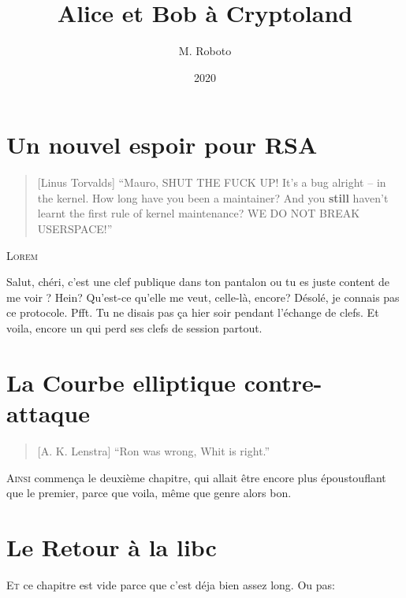 \documentclass[a4paper,12pt,oneside]{memoir}
\title{Alice et Bob à Cryptoland}
\author{M. Roboto}
\date{2020}
\begin{document}
\maketitle
\tableofcontents*

\chapter{Un nouvel espoir pour RSA}

\begin{quote}[Linus Torvalds]
	\enquote{Mauro, SHUT THE FUCK UP! It's a bug alright -- in the kernel.
How long have you been a maintainer? And you \textbf{still} haven't learnt
	the first rule of kernel maintenance? WE DO NOT BREAK USERSPACE!}
\end{quote}

\lettrine{L}{orem} \lipsum[1-4]

\begin{chatlog}
	\say[Alice] Salut, chéri, c'est une clef publique dans ton pantalon ou tu es juste content de me voir ?
	\think[Bob] Hein? Qu'est-ce qu'elle me veut, celle-là, encore?
	\say[Bob] Désolé, je connais pas ce protocole.
	\say[Alice] Pfft. Tu ne disais pas ça hier soir pendant l'échange de clefs.
	\think[Alice] Et voila, encore un qui perd ses clefs de session partout.
\end{chatlog}

\lipsum[5]


\chapter{La Courbe elliptique contre-attaque}

\begin{quote}[A. K. Lenstra]
	\enquote{Ron was wrong, Whit is right.}
\end{quote}	

\lettrine{A}{insi} commença le deuxième chapitre, qui allait être encore plus
époustouflant que le premier, parce que voila, même que genre alors bon.

\lipsum[6-8]

\chapter{Le Retour à la libc}

\lettrine{E}{t} ce chapitre est vide parce que c'est déja bien assez long. Ou pas: \lipsum
\end{document}
